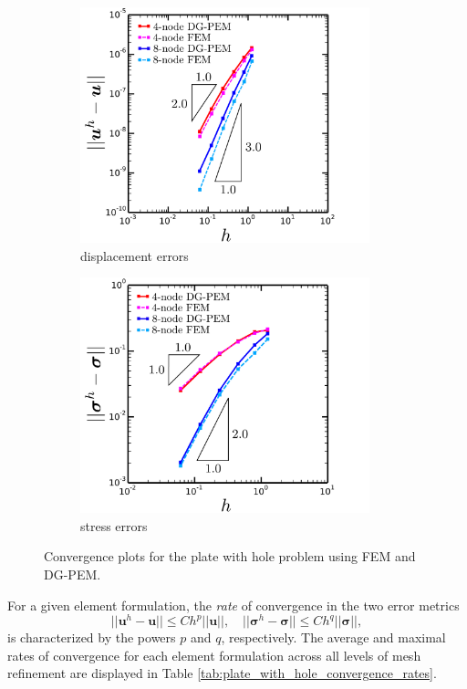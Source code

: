 \begin{figure}[!h]
  \centering
    \begin{subfigure}[b]{0.49\linewidth}
            \centering
            \includegraphics[width=3.3in]{figures/plate_with_hole_l2_errors.pdf}
    			\caption{displacement errors \label{fig:plate_with_hole_l2_errors}}
    \end{subfigure}
	\begin{subfigure}[b]{0.49\linewidth}
            \centering
            \includegraphics[width=3.3in]{figures/plate_with_hole_h1_errors.pdf}
    			\caption{stress errors \label{fig:plate_with_hole_h1_errors}}
    \end{subfigure} \caption{Convergence plots for the plate with hole problem using FEM and DG-PEM.}
  \label{fig:plate_with_hole_errors}
\end{figure}

For a given element formulation, the \textit{rate} of convergence in the two error metrics
\begin{equation}
	|| \bm{u}^h - \bm{u} || \leq C h^p || \bm{u} ||, \quad || \boldsymbol{\sigma}^h - \boldsymbol{\sigma} || \leq C h^q || \boldsymbol{\sigma} ||,
\end{equation}
is characterized by the powers $p$ and $q$, respectively. The average and maximal rates of convergence for each element formulation across all levels of mesh refinement are displayed in Table \ref{tab:plate_with_hole_convergence_rates}.


